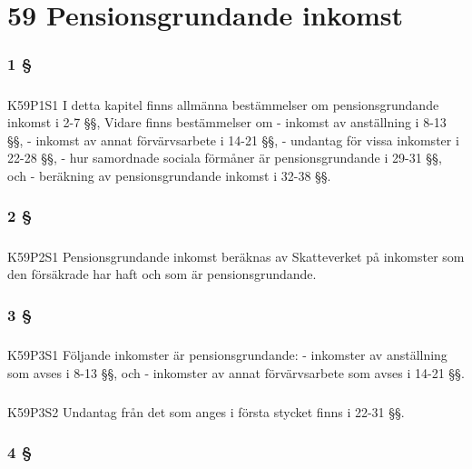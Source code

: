 \documentclass[a4paper,notitlepage,openany,10pt]{book}
\begin{document}
\chapter*{59 Pensionsgrundande inkomst}
\subsection*{1 §}
\paragraph*{}
{\tiny K59P1S1}
I detta kapitel finns allmänna bestämmelser om pensionsgrundande inkomst i 2-7 §§,
Vidare finns bestämmelser om
\newline - inkomst av anställning i 8-13 §§,
\newline - inkomst av annat förvärvsarbete i 14-21 §§,
\newline - undantag för vissa inkomster i 22-28 §§,
\newline - hur samordnade sociala förmåner är pensionsgrundande i 29-31 §§, och
\newline - beräkning av pensionsgrundande inkomst i 32-38 §§.
\subsection*{2 §}
\paragraph*{}
{\tiny K59P2S1}
Pensionsgrundande inkomst beräknas av Skatteverket på inkomster som den försäkrade har haft och som är pensionsgrundande.
\subsection*{3 §}
\paragraph*{}
{\tiny K59P3S1}
Följande inkomster är pensionsgrundande:
\newline - inkomster av anställning som avses i 8-13 §§, och
\newline - inkomster av annat förvärvsarbete som avses i 14-21 §§.
\paragraph*{}
{\tiny K59P3S2}
Undantag från det som anges i första stycket finns i 22-31 §§.
\subsection*{4 §}
\end{document}
